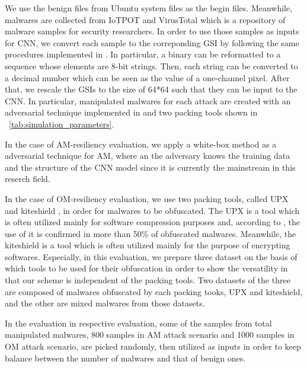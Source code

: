 We use the benign files from Ubuntu system files \cite{ubuntu} as the begin files.
Meanwhile, malwares are collected from IoTPOT \cite{iotpot} and VirusTotal \cite{virustotal} which is a repository of malware samples for security researchers.
In order to use those samples as inputs for CNN, we convert each sample to the correponding GSI by following the same procedures implemented in \cite{previous}.
In particular, a binary can be reformatted to a sequence whose elements are 8-bit strings.
Then, each string can be converted to a decimal number which can be seen as the value of a one-channel pixel.
After that, we rescale the GSIs to the size of 64*64 such that they can be input to the CNN.
In particular, manipulated malwares for each attack are created with an adversarial technique implemented in \cite{ae} and two packing tools \cite{upx, kiteshield} shown in \tablename~\ref{tab:simulation_parameters}.

In the case of AM-resiliency evaluation, we apply a white-box method as a adversarial technique for AM, where an the adversary knows the training data and the structure of the CNN model since it is currently the mainstream in this reserch field.

In the case of OM-resiliency evaluation, we use two packing tools, called UPX \cite{upx} and kiteshield \cite{kiteshield}, in order for malwares to be obfuscated.
The UPX is a tool which is often utilized mainly for software compression purposes and, according to \cite{pack_research}, the use of it is confirmed in more than 50\% of obfuscated malwares. 
Meanwhile, the kiteshield is a tool which is often utilized mainly for the purpose of encrypting softwares.
Especially, in this evaluation, we prepare three dataset on the basis of which tools to be used for their obfuscation in order to show the versatility in that our scheme is independent of the packing tools.
Two datasets of the three are composed of malwares obfuscated by each packing tooks, UPX and kiteshield, and the other are mixed malwares from those datasets. 

In the evaluation in respective evaluation, some of the samples from total manipulated malwares, 800 samples in AM attack scenario and 1000 samples in OM attack scenario, are picked randomly, then utilized as inputs in order to keep balance between the number of malwares and that of benign ones.

